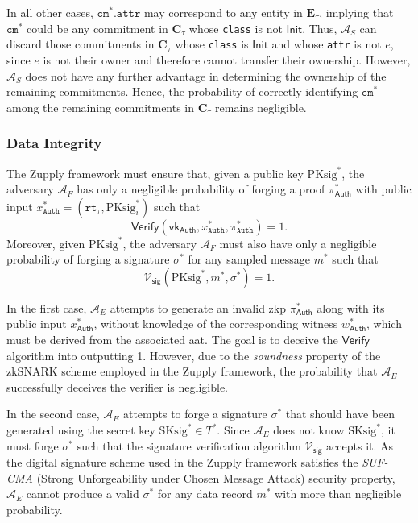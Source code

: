 In all other cases, \( \texttt{cm}^*.\texttt{attr} \) may correspond to any entity in \( \mathbf{E}_\tau \), implying that \( \texttt{cm}^* \) could be any commitment in \( \mathbf{C}_\tau \) whose \texttt{class} is not \( \mathsf{Init} \). Thus, \( \mathcal{A}_S \) can discard those commitments in \( \mathbf{C}_\tau \) whose \texttt{class} is \( \mathsf{Init} \) and whose \texttt{attr} is not \( e \), since \( e \) is not their owner and therefore cannot transfer their ownership. However, \( \mathcal{A}_S \) does not have any further advantage in determining the ownership of the remaining commitments. Hence, the probability of correctly identifying \( \texttt{cm}^* \) among the remaining commitments in \( \mathbf{C}_\tau \) remains negligible.

\subsubsection{Data Integrity}
The Zupply framework must ensure that, given a public key \( \text{PKsig}^\ast \), the adversary \( \mathcal{A}_F \) has only a negligible probability of forging a proof \( \pi_\mathsf{Auth}^\ast \) with public input \( x^\ast_\texttt{Auth} = (\texttt{rt}_\tau, \text{PKsig}^\ast_i) \) such that
\[
\mathsf{Verify}(\mathsf{vk}_\mathsf{Auth}, x^\ast_\texttt{Auth}, \pi^\ast_\texttt{Auth}) = 1.
\]
Moreover, given \( \text{PKsig}^\ast \), the adversary \( \mathcal{A}_F \) must also have only a negligible probability of forging a signature \( \sigma^\ast \) for any sampled message \( m^\ast \) such that
\[
\mathcal{V}_\mathsf{sig}(\text{PKsig}^\ast, m^\ast, \sigma^\ast) = 1.
\]

In the first case, \( \mathcal{A}_E \) attempts to generate an invalid \gls{zkp} \( \pi^\ast_\mathsf{Auth} \) along with its public input \( x^\ast_\mathsf{Auth} \), without knowledge of the corresponding witness \( w^\ast_\mathsf{Auth} \), which must be derived from the associated \gls{aat}. The goal is to deceive the \( \mathsf{Verify} \) algorithm into outputting 1. However, due to the \textit{soundness} property of the zkSNARK scheme employed in the Zupply framework, the probability that \( \mathcal{A}_E \) successfully deceives the verifier is negligible.

In the second case, \( \mathcal{A}_E \) attempts to forge a signature \( \sigma^\ast \) that should have been generated using the secret key \( \text{SKsig}^\ast \in T^\ast \). Since \( \mathcal{A}_E \) does not know \( \text{SKsig}^\ast \), it must forge \( \sigma^\ast \) such that the signature verification algorithm \( \mathcal{V}_\mathsf{sig} \) accepts it. As the digital signature scheme used in the Zupply framework satisfies the \textit{SUF-CMA} (Strong Unforgeability under Chosen Message Attack) security property, \( \mathcal{A}_E \) cannot produce a valid \( \sigma^\ast \) for any data record \( m^\ast \) with more than negligible probability.



